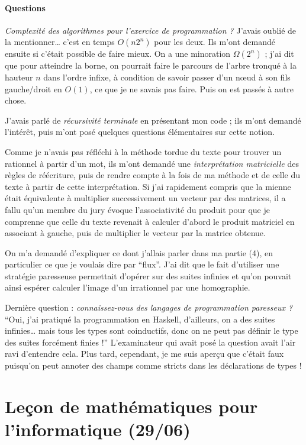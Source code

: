 \documentclass[a4paper, 11pt]{article}
\begin{document}
\paragraph{Questions} \emph{Complexité des algorithmes pour l'exercice de
  programmation ?} J'avais oublié de la mentionner… c'est en temps $O(n 2^n)$
pour les deux. Ils m'ont demandé ensuite si c'était possible de faire mieux. On
a une minoration $\Omega(2^n)$ ; j'ai dit que pour atteindre la borne, on
pourrait faire le parcours de l'arbre tronqué à la hauteur $n$ dans l'ordre
infixe, à condition de savoir passer d'un nœud à son fils gauche/droit en
$O(1)$, ce que je ne savais pas faire. Puis on est passés à autre chose.

J'avais parlé de \emph{récursivité terminale} en présentant mon code ; ils m'ont
demandé l'intérêt, puis m'ont posé quelques questions élémentaires sur cette
notion.

Comme je n'avais pas réfléchi à la méthode tordue du texte pour trouver un
rationnel à partir d'un mot, ils m'ont demandé une \emph{interprétation
  matricielle} des règles de réécriture, puis de rendre compte à la fois de ma
méthode et de celle du texte à partir de cette interprétation. Si j'ai
rapidement compris que la mienne était équivalente à multiplier successivement
un vecteur par des matrices, il a fallu qu'un membre du jury évoque
l'associativité du produit pour que je comprenne que celle du texte revenait à
calculer d'abord le produit matriciel en associant à gauche, puis de multiplier
le vecteur par la matrice obtenue.

On m'a demandé d'expliquer ce dont j'allais parler dans ma partie (4), en
particulier ce que je voulais dire par \enquote{flux}. J'ai dit que le fait
d'utiliser une stratégie paresseuse permettait d'opérer sur des suites infinies
et qu'on pouvait ainsi espérer calculer l'image d'un irrationnel par une
homographie.

Dernière question : \emph{connaissez-vous des langages de programmation
  paresseux ?} \enquote{Oui, j'ai pratiqué la programmation en Haskell,
  d'ailleurs, on a des suites infinies… mais tous les types sont coinductifs,
  donc on ne peut pas définir le type des suites forcément finies !}
L'examinateur qui avait posé la question avait l'air ravi d'entendre cela. Plus
tard, cependant, je me suis aperçu que c'était faux puisqu'on peut annoter des
champs comme stricts dans les déclarations de types !

\newpage

\section*{Leçon de mathématiques pour l'informatique (29/06)}
\end{document}

